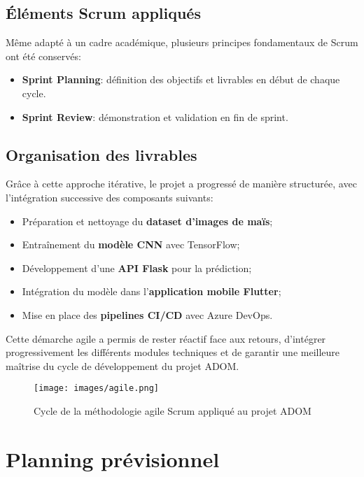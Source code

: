 \documentclass[12pt,a4paper]{report}
\begin{document}
\subsection{Éléments Scrum appliqués}

Même adapté à un cadre académique, plusieurs principes fondamentaux de Scrum ont été conservés:
\begin{itemize}
    \item \textbf{Sprint Planning}: définition des objectifs et livrables en début de chaque cycle.
    \item \textbf{Sprint Review}: démonstration et validation en fin de sprint.

\end{itemize}

\subsection{Organisation des livrables}

Grâce à cette approche itérative, le projet a progressé de manière structurée, avec l’intégration successive des composants suivants:
\begin{itemize}
    \item Préparation et nettoyage du \textbf{dataset d’images de maïs};
    \item Entraînement du \textbf{modèle CNN} avec TensorFlow;
    \item Développement d’une \textbf{API Flask} pour la prédiction;
    \item Intégration du modèle dans l’\textbf{application mobile Flutter};
    \item Mise en place des \textbf{pipelines CI/CD} avec Azure DevOps.
\end{itemize}

Cette démarche agile a permis de rester réactif face aux retours, d’intégrer progressivement les différents modules techniques et de garantir une meilleure maîtrise du cycle de développement du projet ADOM.\@

\begin{figure}[H]
    \centering
    \texttt{[image: images/agile.png]}
    \caption{Cycle de la méthodologie agile Scrum appliqué au projet ADOM}
    \label{fig:agile}
\end{figure}

\cleardoublepage
\section{Planning prévisionnel}
\end{document}
